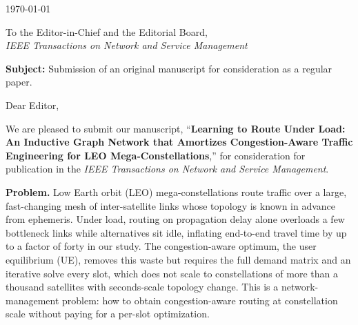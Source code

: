 \documentclass[11pt]{article}
\begin{document}
\noindent\today

\noindent To the Editor-in-Chief and the Editorial Board,\\
\textit{IEEE Transactions on Network and Service Management}

\bigskip
\noindent\textbf{Subject:} Submission of an original manuscript for consideration as a
regular paper.

\bigskip
\noindent Dear Editor,

We are pleased to submit our manuscript, ``\textbf{Learning to Route Under Load: An
Inductive Graph Network that Amortizes Congestion-Aware Traffic Engineering for LEO
Mega-Constellations},'' for consideration for publication in the \emph{IEEE Transactions
on Network and Service Management}.

\textbf{Problem.} Low Earth orbit (LEO) mega-constellations route traffic over a large,
fast-changing mesh of inter-satellite links whose topology is known in advance from
ephemeris. Under load, routing on propagation delay alone overloads a few bottleneck links
while alternatives sit idle, inflating end-to-end travel time by up to a factor of forty in
our study. The congestion-aware optimum, the user equilibrium (UE), removes this waste but
requires the full demand matrix and an iterative solve every slot, which does not scale to
constellations of more than a thousand satellites with seconds-scale topology change. This
is a network-management problem: how to obtain congestion-aware routing at constellation
scale without paying for a per-slot optimization.
\end{document}
